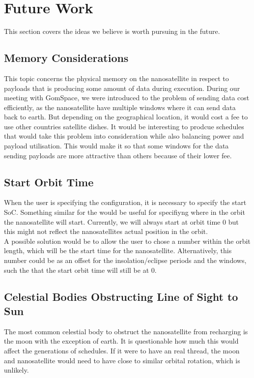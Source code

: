 \section{Future Work} \label{sec:future}
This section covers the ideas we believe is worth pursuing in the future.

\subsection{Memory Considerations}
This topic concerns the physical memory on the nanosatellite in respect to payloads that is producing some amount of data during execution. 
During our meeting with GomSpace, we were introduced to the problem of sending data cost efficiently, as the nanosatellite have multiple windows where it can send data back to earth. 
But depending on the geographical location, it would cost a fee to use other countries satellite dishes.
It would be interesting to prodcue schedules that would take this problem into consideration while also balancing power and payload utilisation.
This would make it so that some windows for the data sending payloads are more attractive than others because of their lower fee.

\subsection{Start Orbit Time}
When the user is specifying the configuration, it is necessary to specify the start SoC. Something similar for the would be useful for specifiyng where in the orbit the nanosatellite will start. Currently, we will always start at orbit time 0 but this might not reflect the nanosatellites actual position in the orbit.\\
A possible solution would be to allow the user to chose a number within the orbit length, which will be the start time for the nanosatellite. Alternatively, this number could be as an offset for the insolation/eclipse periods and the windows, such the that the start orbit time will still be at 0.

\subsection{Celestial Bodies Obstructing Line of Sight to Sun}
The most common celestial body to obstruct the nanosatellite from recharging is the moon with the exception of earth.
It is questionable how much this would affect the generations of schedules. If it were to have an real thread, the moon and nanosatellite would need to have close to similar orbital rotation, which is unlikely. 

